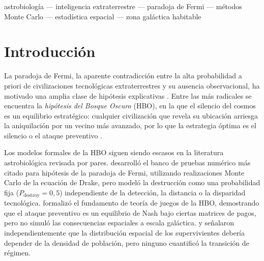 \documentclass[useAMS,usenatbib,onecolumn]{mn2e}
\begin{document}
\begin{keywords}
astrobiología --- inteligencia extraterrestre --- paradoja de Fermi ---
métodos Monte Carlo --- estadística espacial --- zona galáctica habitable
\end{keywords}

\section{Introducción}
\label{sec:intro}

La paradoja de Fermi, la aparente contradicción entre la alta
probabilidad a priori de civilizaciones tecnológicas extraterrestres y
su ausencia observacional, ha motivado una amplia clase de hipótesis
explicativas \citep{fermi1950,hart1975,brin1983,webb2002}.
Entre las más radicales se encuentra la \emph{hipótesis del Bosque
Oscuro} (HBO), en la que el silencio del cosmos es un equilibrio
estratégico: cualquier civilización que revela su ubicación arriesga
la aniquilación por un vecino más avanzado, por lo que la estrategia
óptima es el silencio o el ataque preventivo
\citep{cixin2008,devladar2013}.

Los modelos formales de la HBO siguen siendo escasos en la literatura
astrobiológica revisada por pares.
\citet{forgan2009} desarrolló el banco de pruebas numérico más citado
para hipótesis de la paradoja de Fermi, utilizando realizaciones Monte
Carlo de la ecuación de Drake, pero modeló la destrucción como una
probabilidad fija ($P_\text{destroy} = 0{,}5$) independiente de la
detección, la distancia o la disparidad tecnológica.
\citet{devladar2013} formalizó el fundamento de teoría de juegos de la
HBO, demostrando que el ataque preventivo es un equilibrio de Nash bajo
ciertas matrices de pagos, pero no simuló las consecuencias espaciales
a escala galáctica.
\citet{foucher2023} y \citet{forgan2011} señalaron independientemente
que la distribución espacial de los supervivientes debería depender de
la densidad de población, pero ninguno cuantificó la transición de
régimen.
\end{document}
